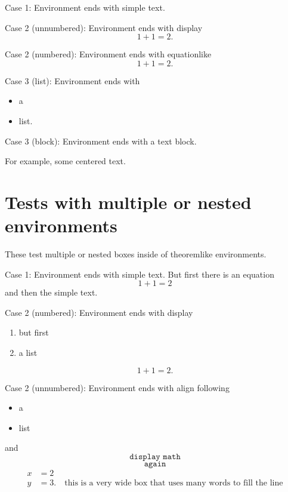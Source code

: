 \begin{theorem}
  Case 1: Environment ends with simple text.
\end{theorem}
\begin{theorem}
  Case 2 (unnumbered): Environment ends with display
  \[
    1 + 1 = 2.
  \]
\end{theorem}
\begin{theorem}
  Case 2 (numbered): Environment ends with equationlike
  \begin{equation}
    1 + 1 = 2.
  \end{equation}
\end{theorem}
\begin{theorem}
  Case 3 (list): Environment ends with
  \begin{itemize}
  \item a
  \item list.
  \end{itemize}
\end{theorem}
\begin{theorem}
  Case 3 (block): Environment ends with a text block.
  \begin{center}
    For example, some centered text.
  \end{center}
\end{theorem}

\section{Tests with multiple or nested environments}

These test multiple or nested boxes inside of theoremlike environments.

\begin{remark}
  Case 1: Environment ends with simple text.
  But first there is an equation
  \begin{equation}
    1+1 = 2
  \end{equation}
  and then the simple text.
\end{remark}
\begin{remark}
  Case 2 (numbered): Environment ends with display
  \begin{enumerate}
  \item but first
  \item a list
  \end{enumerate}
  \[
    1 + 1 = 2.
  \]
\end{remark}
\begin{remark}
  Case 2 (unnumbered): Environment ends with align
  following
  \begin{itemize}
  \item a
  \item list
  \end{itemize}
  and
  \[
    \texttt{ display math }
  \]
  \[
    \texttt{ again }
  \]
  \begin{align}
    x & = 2\\
    y & = 3. \quad \text{this is a very wide box that uses many words to fill the line}
  \end{align}
\end{remark}

